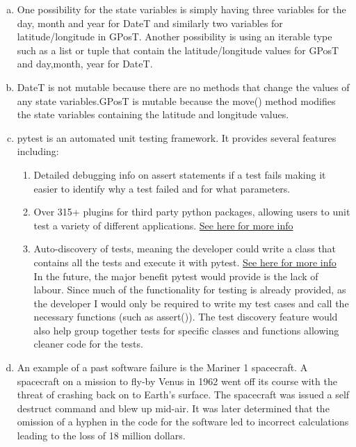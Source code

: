\documentclass[12pt]{article}
\begin{document}
\begin{enumerate}[(a)]

\item One possibility for the state variables is simply having three variables for the day, month and year for DateT and similarly two variables for latitude/longitude in GPosT. Another possibility is using an iterable type such as a list or tuple that contain the latitude/longitude values for GPosT and day,month, year for DateT.

\item DateT is not mutable because there are no methods that change the values of any state variables.GPosT is mutable because the move() method modifies the state variables containing the latitude and longitude values.

\item pytest is an automated unit testing framework. It provides several features including:
\begin{enumerate}[(1)]

\item Detailed debugging info on assert statements if a test fails making it easier to identify why a test failed and for what parameters.
\item Over 315+ plugins for third party python packages, allowing users to unit test a variety of different applications. \href{http://plugincompat.herokuapp.com/}{See here for more info}

\item Auto-discovery of tests, meaning the developer could write a class that contains all the tests and execute it with pytest. \href{https://docs.pytest.org/en/latest/goodpractices.html#test-discovery}{See here for more info}\\

In the future, the major benefit pytest would provide is the lack of labour. Since much of the functionality for testing is already provided, as the developer I would only be required to write my test cases and call the necessary functions (such as assert()). The test discovery feature would also help group together tests for specific classes and functions allowing cleaner code for the tests.

\end{enumerate}

\item An example of a past software failure is the Mariner 1 spacecraft. A spacecraft on a mission to fly-by Venus in 1962
went off its course with the threat of crashing back on to Earth's surface. The spacecraft was issued a self destruct command and 
blew up mid-air. It was later determined that the omission of a hyphen in the code for the software led to incorrect calculations leading to the loss of 18 million dollars. \\


\end{enumerate}
\end{document}
